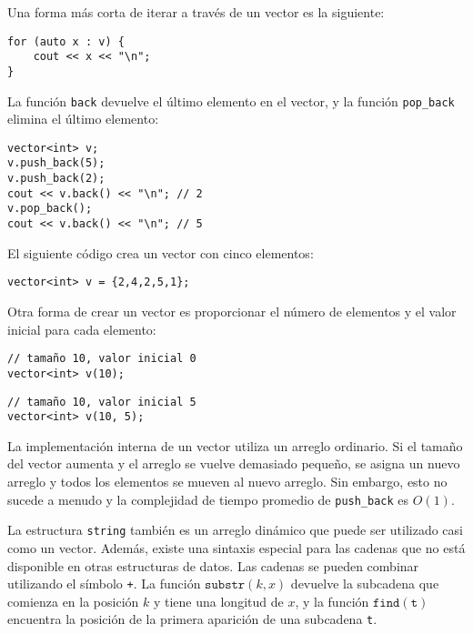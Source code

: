 \begin{samepage}
Una forma más corta de iterar a través de un vector es la siguiente:

\begin{lstlisting}
for (auto x : v) {
    cout << x << "\n";
}
\end{lstlisting}
\end{samepage}

La función \texttt{back} devuelve el último elemento
en el vector, y
la función \texttt{pop\_back} elimina el último elemento:

\begin{lstlisting}
vector<int> v;
v.push_back(5);
v.push_back(2);
cout << v.back() << "\n"; // 2
v.pop_back();
cout << v.back() << "\n"; // 5
\end{lstlisting}

El siguiente código crea un vector con cinco elementos:

\begin{lstlisting}
vector<int> v = {2,4,2,5,1};
\end{lstlisting}

Otra forma de crear un vector es proporcionar el número
de elementos y el valor inicial para cada elemento:

\begin{lstlisting}
// tamaño 10, valor inicial 0
vector<int> v(10);
\end{lstlisting}
\begin{lstlisting}
// tamaño 10, valor inicial 5
vector<int> v(10, 5);
\end{lstlisting}

La implementación interna de un vector
utiliza un arreglo ordinario.
Si el tamaño del vector aumenta y
el arreglo se vuelve demasiado pequeño,
se asigna un nuevo arreglo y todos los
elementos se mueven al nuevo arreglo.
Sin embargo, esto no sucede a menudo y la
complejidad de tiempo promedio de
\texttt{push\_back} es $O(1)$.


La estructura \texttt{string} también es un arreglo dinámico que
puede ser utilizado casi como un vector.
Además, existe una sintaxis especial para las cadenas
que no está disponible en otras estructuras de datos.
Las cadenas se pueden combinar utilizando el símbolo \texttt{+}.
La función $\texttt{substr}(k,x)$ devuelve la subcadena
que comienza en la posición $k$ y tiene una longitud de $x$,
y la función $\texttt{find}(\texttt{t})$ encuentra la posición
de la primera aparición de una subcadena \texttt{t}.

